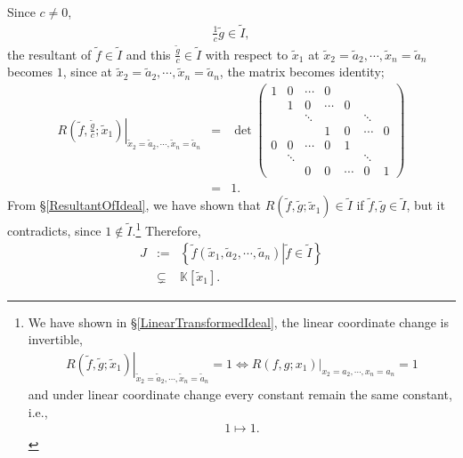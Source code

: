 \documentclass[11pt]{book}
\begin{document}
Since $c \neq 0$,
\begin{eqnarray}
\frac{1}{c} \tilde{g} \in \tilde{I},
\end{eqnarray}
the resultant of $\tilde{f} \in \tilde{I}$ and this $\frac{\tilde{g}}{c} \in \tilde{I}$ with respect to $\tilde{x}_1$ at $\tilde{x}_2 = \tilde{a}_2, \cdots, \tilde{x}_n = \tilde{a}_n$ becomes $1$, since at $\tilde{x}_2 = \tilde{a}_2, \cdots, \tilde{x}_n = \tilde{a}_n$, the matrix becomes identity;
\begin{eqnarray}
\nonumber
\left. R\left(\tilde{f}, \frac{\tilde{g}}{c}; \tilde{x}_1 \right) \right|_{\tilde{x}_2 = \tilde{a}_2, \cdots, \tilde{x}_n = \tilde{a}_n}
&=&
\det\left(\begin{array}{ccccccc} 1 & 0 & \cdots  & 0 &   &   &   \\ & 1 & 0 & \cdots  & 0 &   &   \\  &   & \ddots  &   &   & \ddots  &   \\  &   &   &  1 & 0 & \cdots  & 0  \\ 0  & 0& \cdots  & 0 & 1 &   &   \\  &  \ddots &   &   &   &  \ddots &   \\  &   &  0 & 0 & \cdots  & 0  & 1 \end{array}\right)\\
&=& 1.
\end{eqnarray}
From \S\ref{ResultantOfIdeal}, we have shown that $R(\tilde{f}, \tilde{g}; \tilde{x}_1) \in \tilde{I}$ if $\tilde{f}, \tilde{g} \in \tilde{I}$, but it contradicts, since $1 \not\in \tilde{I}$.\footnote{
We have shown in \S\ref{LinearTransformedIdeal}, the linear coordinate change is invertible, 
\begin{eqnarray}
\left. R\left(\tilde{f}, \tilde{g}; \tilde{x}_1 \right) \right|_{\tilde{x}_2 = \tilde{a}_2, \cdots, \tilde{x}_n = \tilde{a}_n}
= 1
\Leftrightarrow
\left. R\left(f, g; x_1 \right) \right|_{x_2 = a_2, \cdots, x_n = a_n}
= 1
\end{eqnarray}
and under linear coordinate change every constant remain the same constant, i.e.,
\begin{eqnarray}
1 \mapsto 1.
\end{eqnarray}
}
Therefore, 
\begin{eqnarray}
\nonumber
J &:=& \left\{\left. \tilde{f}(\tilde{x}_1 , \tilde{a}_2, \cdots, \tilde{a}_n) \right| \tilde{f} \in \tilde{I} \right\} \\
&\subsetneq & \mathbb{K}[\tilde{x}_1].
\end{eqnarray}
\end{document}
